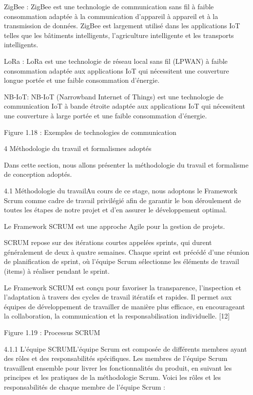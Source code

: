 \documentclass{article}
\begin{document}
ZigBee : ZigBee est une technologie de communication sans fil à faible consommation adaptée à la communication d'appareil à appareil et à la transmission de données. ZigBee est largement utilisé dans les applications IoT telles que les bâtiments intelligents, l'agriculture intelligente et les transports intelligents.

LoRa : LoRa est une technologie de réseau local sans fil (LPWAN) à faible consommation adaptée aux applications IoT qui nécessitent une couverture longue portée et une faible consommation d'énergie.

NB-IoT: NB-IoT (Narrowband Internet of Things) est une technologie de communication IoT à bande étroite adaptée aux applications IoT qui nécessitent une couverture à large portée et une faible consommation d'énergie.

Figure 1.18 : Exemples de technologies de communication

4 Méthodologie du travail et formalismes adoptés

Dans cette section, nous allons  présenter la  méthodologie du travail et formalisme de conception adoptés.

4.1 Méthodologie du travailAu cours de ce stage, nous adoptons le Framework Scrum comme cadre de travail privilégié afin de garantir le bon déroulement de toutes les étapes de notre projet et d’en assurer le développement optimal.

Le Framework SCRUM est une approche Agile pour la gestion de projets.

SCRUM repose sur des itérations courtes appelées sprints, qui durent généralement de deux à quatre semaines. Chaque sprint est précédé d’une réunion de planification de sprint, où l’équipe Scrum sélectionne les éléments de travail (items) à réaliser pendant le sprint.

Le Framework SCRUM est conçu pour favoriser la transparence, l’inspection et l’adaptation à travers des cycles de travail itératifs et rapides. Il permet aux équipes de développement de travailler de manière plus efficace, en encourageant la collaboration, la communication et la responsabilisation individuelle. [12]

Figure 1.19 : Processus SCRUM

4.1.1 L’équipe SCRUML’équipe Scrum est composée de différents membres ayant des rôles et des responsabilités spécifiques. Les membres de l’équipe Scrum travaillent ensemble pour livrer les fonctionnalités du produit, en suivant les principes et les pratiques de la méthodologie Scrum. Voici les rôles et les responsabilités de chaque membre de l’équipe Scrum :
\end{document}
